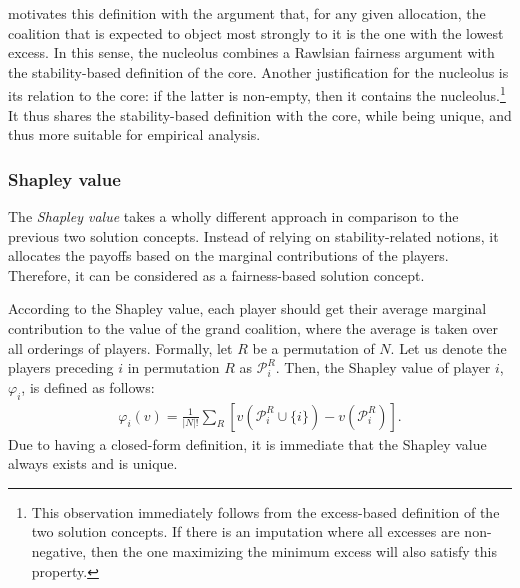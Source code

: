 \textcite{schmeidler1969nucleolus} motivates this definition with the argument that, for any given allocation, the coalition that is expected to object most strongly to it is the one with the lowest excess. In this sense, the nucleolus combines a Rawlsian fairness argument with the stability-based definition of the core. Another justification for the nucleolus is its relation to the core: if the latter is non-empty, then it contains the nucleolus.\footnote{This observation immediately follows from the excess-based definition of the two solution concepts. If there is an imputation where all excesses are non-negative, then the one maximizing the minimum excess will also satisfy this property.} It thus shares the stability-based definition with the core, while being unique, and thus more suitable for empirical analysis.

\subsubsection{Shapley value}

The \emph{Shapley value} \parencite{shapley1953value} takes a wholly different approach in comparison to the previous two solution concepts. Instead of relying on stability-related notions, it allocates the payoffs based on the marginal contributions of the players. Therefore, it can be considered as a fairness-based solution concept.

According to the Shapley value, each player should get their average marginal contribution to the value of the grand coalition, where the average is taken over all orderings of players. Formally, let $R$ be a permutation of $N$. Let us denote the players preceding $i$ in permutation $R$ as $\mathcal{P}_i^R$. Then, the Shapley value of player $i$, $\varphi_i$, is defined as follows:
\begin{align}
    \varphi_i(v) = \frac{1}{|N|!}\sum_R \left[ v(\mathcal{P}_i^R \cup \{i\})  - v(\mathcal{P}_i^R) \right]. \label{eq:shapley_vale}
\end{align}
Due to having a closed-form definition, it is immediate that the Shapley value always exists and is unique.

